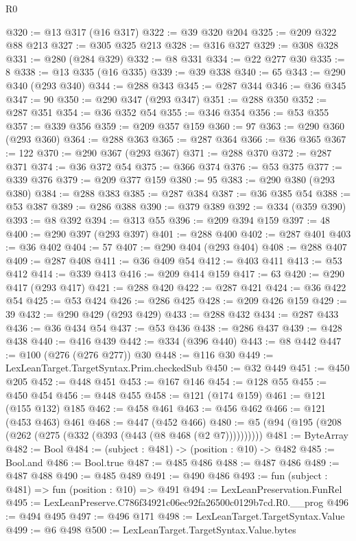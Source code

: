 \begin{lexlean}{R0}
\begin{coremodule}
@320 := @13 @317 (@16 @317)
@322 := @39 @320 @204
@325 := @209 @322 @88 @213
@327 := @305 @325 @213
@328 := @316 @327
@329 := @308 @328
@331 := @280 (@284 @329)
@332 := @8 @331
@334 := @22 @277 @30
@335 := 8
@338 := @13 @335 (@16 @335)
@339 := @39 @338
@340 := 65
@343 := @290 @340 (@293 @340)
@344 := @288 @343
@345 := @287 @344
@346 := @36 @345
@347 := 90
@350 := @290 @347 (@293 @347)
@351 := @288 @350
@352 := @287 @351
@354 := @36 @352 @54
@355 := @346 @354
@356 := @53 @355
@357 := @339 @356
@359 := @209 @357 @159
@360 := 97
@363 := @290 @360 (@293 @360)
@364 := @288 @363
@365 := @287 @364
@366 := @36 @365
@367 := 122
@370 := @290 @367 (@293 @367)
@371 := @288 @370
@372 := @287 @371
@374 := @36 @372 @54
@375 := @366 @374
@376 := @53 @375
@377 := @339 @376
@379 := @209 @377 @159
@380 := 95
@383 := @290 @380 (@293 @380)
@384 := @288 @383
@385 := @287 @384
@387 := @36 @385 @54
@388 := @53 @387
@389 := @286 @388
@390 := @379 @389
@392 := @334 (@359 @390)
@393 := @8 @392
@394 := @313 @55
@396 := @209 @394 @159
@397 := 48
@400 := @290 @397 (@293 @397)
@401 := @288 @400
@402 := @287 @401
@403 := @36 @402
@404 := 57
@407 := @290 @404 (@293 @404)
@408 := @288 @407
@409 := @287 @408
@411 := @36 @409 @54
@412 := @403 @411
@413 := @53 @412
@414 := @339 @413
@416 := @209 @414 @159
@417 := 63
@420 := @290 @417 (@293 @417)
@421 := @288 @420
@422 := @287 @421
@424 := @36 @422 @54
@425 := @53 @424
@426 := @286 @425
@428 := @209 @426 @159
@429 := 39
@432 := @290 @429 (@293 @429)
@433 := @288 @432
@434 := @287 @433
@436 := @36 @434 @54
@437 := @53 @436
@438 := @286 @437
@439 := @428 @438
@440 := @416 @439
@442 := @334 (@396 @440)
@443 := @8 @442
@447 := @100 (@276 (@276 @277)) @30
@448 := @116 @30
@449 := LexLeanTarget.TargetSyntax.Prim.checkedSub
@450 := @32 @449
@451 := @450 @205
@452 := @448 @451
@453 := @167 @146
@454 := @128 @55
@455 := @450 @454
@456 := @448 @455
@458 := @121 (@174 @159)
@461 := @121 (@155 @132) @185
@462 := @458 @461
@463 := @456 @462
@466 := @121 (@453 @463) @461
@468 := @447 (@452 @466)
@480 := @5 (@94 (@195 (@208 (@262 (@275 (@332 (@393 (@443 (@8 @468 (@2 @7))))))))))
@481 := ByteArray
@482 := Bool
@484 := (subject : @481) -> (position : @10) -> @482
@485 := Bool.and
@486 := Bool.true
@487 := @485 @486
@488 := @487 @486
@489 := @487 @488
@490 := @485 @489
@491 := @490 @486
@493 := fun (subject : @481) => fun (position : @10) => @491
@494 := LexLeanPreservation.FunRel
@495 := LexLeanPreserve.C786f34921c06ec92fa26500c0129b7cd.R0.__prog
@496 := @494 @495
@497 := @496 @171
@498 := LexLeanTarget.TargetSyntax.Value
@499 := @6 @498
@500 := LexLeanTarget.TargetSyntax.Value.bytes

\end{coremodule}
\end{lexlean}
